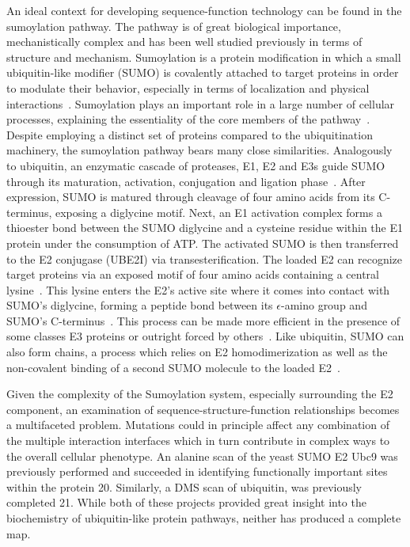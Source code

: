 An ideal context for developing sequence-function technology can be found in the sumoylation pathway. The pathway is of great biological importance, mechanistically complex and has been well studied previously in terms of structure and mechanism. Sumoylation is a protein modification in which a small ubiquitin-like modifier (SUMO) is covalently attached to target proteins in order to modulate their behavior, especially in terms of localization and physical interactions~\cite{sumoylation}. Sumoylation plays an important role in a large number of cellular processes, explaining the essentiality of the core members of the pathway~. 
Despite employing a distinct set of proteins compared to the ubiquitination machinery, the sumoylation pathway bears many close similarities. Analogously to ubiquitin, an enzymatic cascade of proteases, E1, E2 and E3s guide SUMO through its maturation, activation, conjugation and ligation phase~\cite{sumoylation}. After expression, SUMO is matured through cleavage of four amino acids from its C-terminus, exposing a diglycine motif. Next, an E1 activation complex forms a thioester bond between the SUMO diglycine and a cysteine residue within the E1 protein under the consumption of ATP. The activated SUMO is then transferred to the E2 conjugase (UBE2I) via transesterification. The loaded E2 can recognize target proteins via an exposed motif of four amino acids containing a central lysine~\cite{Sampson2001}. This lysine enters the E2’s active site where it comes into contact with SUMO’s diglycine, forming a peptide bond between its $\epsilon$-amino group and SUMO’s C-terminus~\cite{BernierVillamor2002}. This process can be made more efficient in the presence of some classes E3 proteins or outright forced by others~\cite{Streich2016}. Like ubiquitin, SUMO can also form chains, a process which relies on E2 homodimerization as well as the non-covalent binding of a second SUMO molecule to the loaded E2~\cite{CapiliLima2007,Alontaga2015}. 

Given the complexity of the Sumoylation system, especially surrounding the E2 component, an examination of sequence-structure-function relationships becomes a multifaceted problem. Mutations could in principle affect any combination of the multiple interaction interfaces which in turn contribute in complex ways to the overall cellular phenotype.
An alanine scan of the yeast SUMO E2 Ubc9 was previously performed and succeeded in identifying functionally important sites within the protein 20. Similarly, a DMS scan of ubiquitin, was previously completed 21. While both of these projects provided great insight into the biochemistry of ubiquitin-like protein pathways, neither has produced a complete map.

